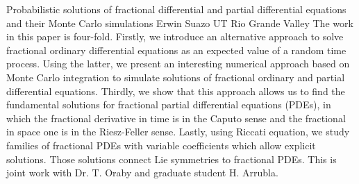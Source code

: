 \begin{addmargin}[2em]{0em}
\vspace{1.5ex}
\abs 
{Probabilistic solutions of fractional differential and partial differential equations and their Monte Carlo simulations}
{Erwin Suazo}
{UT Rio Grande Valley}
{The work in this paper is four-fold. Firstly, we introduce an alternative approach to solve fractional ordinary differential equations as an expected value of a random time process. Using the latter, we present an interesting numerical approach based on Monte Carlo integration to simulate solutions of fractional ordinary and partial differential equations. Thirdly, we show that this approach allows us to find the fundamental solutions for fractional partial differential equations (PDEs), in which the fractional derivative in time is in the Caputo sense and the fractional in space one is in the Riesz-Feller sense. Lastly, using Riccati equation, we study families of fractional PDEs with variable coefficients which allow explicit solutions. Those solutions connect Lie symmetries to fractional PDEs. This is joint work with Dr. T. Oraby and graduate student H. Arrubla. 
}


\end{addmargin}




